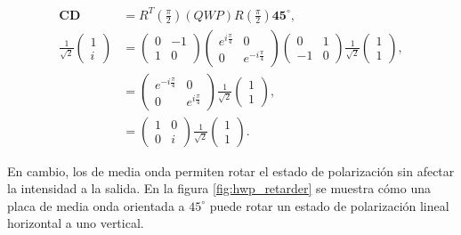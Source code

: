 \begin{align*}
\mathbf{CD} &=
R^{T}\left(\frac{\pi}{2}\right)\left(QWP\right)R\left(\frac{\pi}{2}\right)\mathbf{45}^{\circ},\\ 
  \frac{1}{\sqrt{2}}
\begin{pmatrix}
1\\i
\end{pmatrix}&=
\begin{pmatrix}
  0 &-1\\1&0
\end{pmatrix}
\begin{pmatrix} e^{i\frac{\pi}{4}}  &0\\0&e^{-i\frac{\pi}{4}} \end{pmatrix}
\begin{pmatrix}
  0&1\\-1&0
\end{pmatrix}
 \frac{1}{\sqrt{2}}
\begin{pmatrix}
1\\ 1
\end{pmatrix},
\\
&=
\begin{pmatrix}
e^{-i\frac{\pi}{4}}  & 0 \\0 & e^{i\frac{\pi}{4}} 
\end{pmatrix}
  \frac{1}{\sqrt{2}}
\begin{pmatrix}
1\\ 1
\end{pmatrix},\\
&=
\begin{pmatrix}
1  & 0 \\0 & i
\end{pmatrix}
  \frac{1}{\sqrt{2}}
\begin{pmatrix}
1\\ 1
\end{pmatrix}.
\end{align*}

En cambio, los de media onda permiten rotar el estado de
polarización sin afectar la intensidad a la salida. En la
figura \ref{fig:hwp_retarder} se muestra cómo una placa de media onda
orientada a $45^{\circ}$ puede rotar un estado de polarización lineal
horizontal a uno vertical. 

